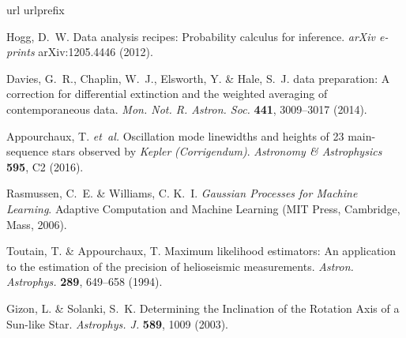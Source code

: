 %
\begin{thebibliography}{99}
	\makeatletter
	\addtocounter{\@listctr}{78}
	\makeatother
	\expandafter\ifx\csname url\endcsname\relax
	\def\url#1{\texttt{#1}}\fi
	\expandafter\ifx\csname urlprefix\endcsname\relax\def\urlprefix{URL }\fi
	\providecommand{\bibinfo}[2]{#2}
	\providecommand{\eprint}[2][]{\url{#2}}
	
\bibinfo{author}{Hogg, D.~W.}
\newblock \bibinfo{title}{Data analysis recipes: {{Probability}} calculus for
	inference}.
\newblock \emph{\bibinfo{journal}{arXiv e-prints}}
\bibinfo{pages}{arXiv:1205.4446} (\bibinfo{year}{2012}).

\bibinfo{author}{Davies, G.~R.}, \bibinfo{author}{Chaplin, W.~J.},
\bibinfo{author}{Elsworth, Y.} \& \bibinfo{author}{Hale, S.~J.}
\newblock \bibinfo{title}{{{BiSON}} data preparation: A correction for
	differential extinction and the weighted averaging of contemporaneous data}.
\newblock \emph{\bibinfo{journal}{Mon. Not. R. Astron. Soc.}}
\textbf{\bibinfo{volume}{441}}, \bibinfo{pages}{3009--3017}
(\bibinfo{year}{2014}).

\bibinfo{author}{Appourchaux, T.} \emph{et~al.}
\newblock \bibinfo{title}{Oscillation mode linewidths and heights of 23
	main-sequence stars observed by {{{\emph{Kepler}}}}
	{\emph{(}}{{{\emph{Corrigendum}}}}{\emph{)}}}.
\newblock \emph{\bibinfo{journal}{Astronomy \& Astrophysics}}
\textbf{\bibinfo{volume}{595}}, \bibinfo{pages}{C2} (\bibinfo{year}{2016}).

\bibinfo{author}{Rasmussen, C.~E.} \& \bibinfo{author}{Williams, C. K.~I.}
\newblock \emph{\bibinfo{title}{Gaussian Processes for Machine Learning}}.
\newblock Adaptive Computation and Machine Learning (\bibinfo{publisher}{{MIT
		Press}}, \bibinfo{address}{{Cambridge, Mass}}, \bibinfo{year}{2006}).

\bibinfo{author}{Toutain, T.} \& \bibinfo{author}{Appourchaux, T.}
\newblock \bibinfo{title}{Maximum likelihood estimators: {{An}} application to
	the estimation of the precision of helioseismic measurements}.
\newblock \emph{\bibinfo{journal}{Astron. Astrophys.}}
\textbf{\bibinfo{volume}{289}}, \bibinfo{pages}{649--658}
(\bibinfo{year}{1994}).

\bibinfo{author}{Gizon, L.} \& \bibinfo{author}{Solanki, S.~K.}
\newblock \bibinfo{title}{Determining the {{Inclination}} of the {{Rotation
			Axis}} of a {{Sun}}-like {{Star}}}.
\newblock \emph{\bibinfo{journal}{Astrophys. J.}}
\textbf{\bibinfo{volume}{589}}, \bibinfo{pages}{1009} (\bibinfo{year}{2003}).


\end{thebibliography}
